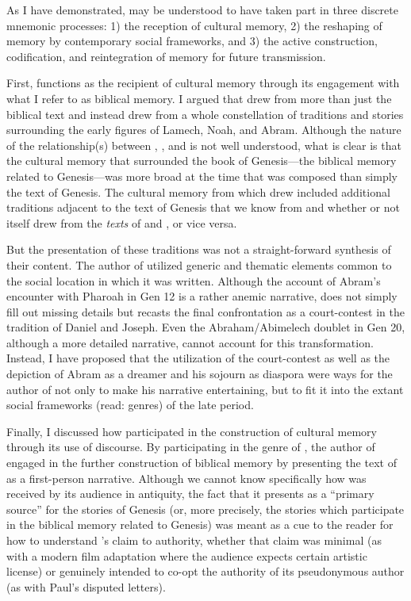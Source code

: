 As I have demonstrated, \ga may be understood to have taken part in three discrete mnemonic processes: 1) the reception of cultural memory, 2) the reshaping of memory by contemporary social frameworks, and 3) the active construction, codification, and reintegration of memory for future transmission. 

First, \ga functions as the recipient of cultural memory through its engagement with what I refer to as biblical memory. I argued that \ga drew from more than just the biblical text and instead drew from a whole constellation of traditions and stories surrounding the early figures of Lamech, Noah, and Abram. Although the nature of the relationship(s) between \firstenoch, \jub, and \ga is not well understood, what is clear is that the cultural memory that surrounded the book of Genesis---the biblical memory related to Genesis---was more broad at the time that \ga was composed than simply the text of Genesis. The cultural memory from which \ga drew included additional traditions adjacent to the text of Genesis that we know from \jub and \firstenoch whether or not \ga itself drew from the \emph{texts} of \jub and \firstenoch, or vice versa.


But the presentation of these traditions was not a straight-forward synthesis of their content. The author of \ga utilized generic and thematic elements common to the social location in which it was written. Although the account of Abram's encounter with Pharoah in Gen 12 is a rather anemic narrative, \ga does not simply fill out missing details but recasts the final confrontation as a court-contest in the tradition of Daniel and Joseph. Even the Abraham/Abimelech doublet in Gen 20, although a more detailed narrative, cannot account for this transformation. Instead, I have proposed that the utilization of the court-contest as well as the depiction of Abram as a dreamer and his sojourn as diaspora were ways for the author of \ga not only to make his narrative entertaining, but to fit it into the extant social frameworks (read: genres) of the late \secondtemple period.

Finally, I discussed how \ga participated in the construction of cultural memory through its use of \psgraphical discourse. By participating in the genre of \psy, the author of \ga engaged in the further construction of biblical memory by presenting the text of \ga as a first-person narrative. Although we cannot know specifically how \ga was received by its audience in antiquity, the fact that it presents as a ``primary source'' for the stories of Genesis (or, more precisely, the stories which participate in the biblical memory related to Genesis) was meant as a cue to the reader for how to understand \ga's claim to authority, whether that claim was minimal (as with a modern film adaptation where the audience expects certain artistic license) or genuinely intended to co-opt the authority of its pseudonymous author (as with Paul's disputed letters).

